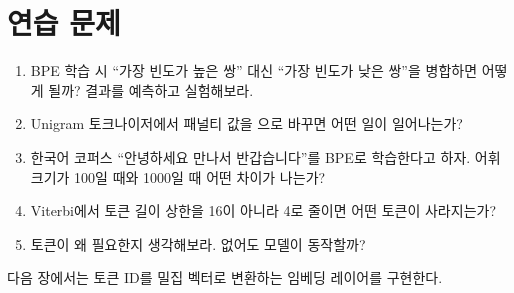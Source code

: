 \section{연습 문제}

\begin{enumerate}
  \item BPE 학습 시 ``가장 빈도가 높은 쌍'' 대신 ``가장 빈도가 낮은 쌍''을 병합하면 어떻게 될까? 결과를 예측하고 실험해보라.
  \item Unigram 토크나이저에서  패널티 값을 으로 바꾸면 어떤 일이 일어나는가?
  \item 한국어 코퍼스 ``안녕하세요 만나서 반갑습니다''를 BPE로 학습한다고 하자. 어휘 크기가 100일 때와 1000일 때 어떤 차이가 나는가?
  \item Viterbi에서 토큰 길이 상한을 16이 아니라 4로 줄이면 어떤 토큰이 사라지는가?
  \item {} 토큰이 왜 필요한지 생각해보라. 없어도 모델이 동작할까?
\end{enumerate}

다음 장에서는 토큰 ID를 밀집 벡터로 변환하는 임베딩 레이어를 구현한다.
